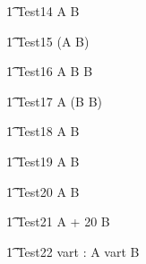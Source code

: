 
\begin{circusaction}
   \t1 Test14 \circdef  A \circseq B \circendby {} \rcirctime  \\
\end{circusaction}

\begin{circusaction}
   \t1 Test15 \circdef  (A \circseq B) \circendby {} \rcirctime \\
\end{circusaction}

\begin{circusaction}
   \t1 Test16 \circdef  A \circseq B \circendby {} \rcirctime \circseq B \\
\end{circusaction}

\begin{circusaction}
   \t1 Test17 \circdef  A \circseq (B \circendby {} \rcirctime \circseq B)\\
\end{circusaction}

\begin{circusaction}
   \t1 Test18 \circdef  A \circendby {} \rcirctime  \circseq B \circendby {} \rcirctime\\
\end{circusaction}


\begin{circusaction}
   \t1 Test19 \circdef  A \circtimeout {} \rcirctime B  \\
\end{circusaction}

\begin{circusaction}
   \t1 Test20 \circdef  A \circtimeout {}  \rcirctime B \\
\end{circusaction}

\begin{circusaction}
   \t1 Test21 \circdef  A \circtimeout {} + 20 \rcirctime B  \\
\end{circusaction}

\begin{circusaction}
   \t1 Test22 \circdef \circvres vart : \nat  \circspot  A \circtimeout \lcirctime vart \rcirctime B \\
\end{circusaction}

